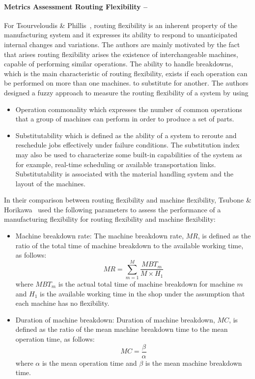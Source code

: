  \paragraph{Metrics Assessment Routing Flexibility --}
For Tsourveloudis \& Phillis~\cite{Tsourveloudis.1998}, routing flexibility is an inherent property of the manufacturing system and it expresses its ability to respond to unanticipated internal changes and variations. The authors are mainly motivated by the fact that arises routing flexibility arises the existence of interchangeable machines, capable of performing similar operations. The ability to handle breakdowns, which is the main characteristic of routing flexibility, exists if each operation can be performed on more than one machines. to substitute for another. The authors designed a fuzzy approach to measure the routing flexibility of a system by using
\begin{itemize}
\item Operation commonality which expresses the number of common operations that a group of machines can perform in order to produce a set of parts.
\item Substitutability which is defined as the ability of a system to reroute and reschedule jobs effectively under failure conditions. The substitution index may also be used to characterize some built-in capabilities of the system as for example, real-time scheduling or available transportation links. Substitutability is associated with the material handling system and the layout of the machines.
\end{itemize}
In their comparison between routing flexibility and machine flexibility, Tsubone \& Horikawa~\cite{Tsubone.1999} used the following parameters to assess the performance of a manufacturing flexibility for routing flexibility and machine flexibility:
    \begin{itemize}
    \item Machine breakdown rate: The machine breakdown rate, $MR$, is defined as the ratio of the total time of machine breakdown to the available working time, as follows:
    \begin{equation}
    MR=\sum\limits_{m=1}^{M}\frac{MBT_m}{M\times H_1}
    \end{equation}
    where $MBT_m$ is the actual total time of machine breakdown for machine $m$ and $H_1$ is the available working time in the shop under the assumption that each machine has
no flexibility.
    \item Duration of machine breakdown: Duration of machine breakdown, $MC$, is defined as the ratio of the mean machine breakdown time to the mean operation time, as follows:
        \begin{equation}
    MC=\frac{\beta}{\alpha}
    \end{equation}
    where $\alpha$ is the mean operation time and $\beta$ is the mean machine breakdown time.
    \end{itemize}

